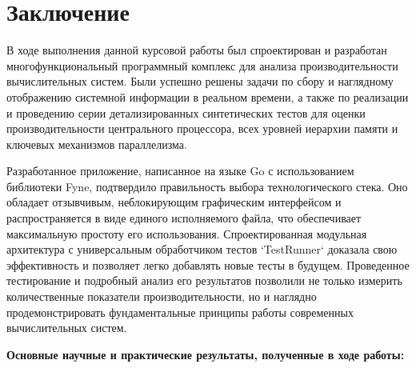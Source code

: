 \section*{Заключение}

В ходе выполнения данной курсовой работы был спроектирован и разработан многофункциональный программный комплекс для анализа производительности вычислительных систем. Были успешно решены задачи по сбору и наглядному отображению системной информации в реальном времени, а также по реализации и проведению серии детализированных синтетических тестов для оценки производительности центрального процессора, всех уровней иерархии памяти и ключевых механизмов параллелизма.

Разработанное приложение, написанное на языке Go с использованием библиотеки Fyne, подтвердило правильность выбора технологического стека. Оно обладает отзывчивым, неблокирующим графическим интерфейсом и распространяется в виде единого исполняемого файла, что обеспечивает максимальную простоту его использования. Спроектированная модульная архитектура с универсальным обработчиком тестов `TestRunner` доказала свою эффективность и позволяет легко добавлять новые тесты в будущем. Проведенное тестирование и подробный анализ его результатов позволили не только измерить количественные показатели производительности, но и наглядно продемонстрировать фундаментальные принципы работы современных вычислительных систем.

\textbf{Основные научные и практические результаты, полученные в ходе работы:}

